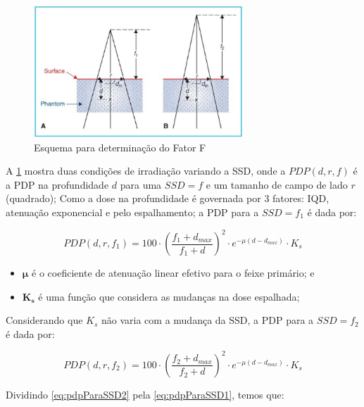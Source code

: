 \documentclass[11pt,a4paper]{article}
\newcounter{exemplo}
\begin{document}
	\begin{figure}[h]
		\centering
		\includegraphics[width=0.7\textwidth]{Imagens/fatorF.JPG}
		\caption{Esquema para determinação do Fator F}
		\label{fig:fatorF}
	\end{figure}
	
	A \ref{fig:fatorF} mostra duas condições de irradiação variando a SSD, onde a $PDP(d,r,f)$ é a PDP na profundidade $d$ para uma $SSD = f$ e um tamanho de campo de lado $r$ (quadrado); Como a dose na profundidade é governada por 3 fatores: IQD, atenuação exponencial e pelo espalhamento; a PDP  para a $SSD = f_1$ é dada por:
	
		\begin{equation}
			PDP(d, r, f_1) = 100 \cdot \left(\frac{f_1 + d_{max}}{f_1 + d}\right)^2 \cdot e^{-\mu (d - d_{max})} \cdot K_s
			\label{eq:pdpParaSSD1}
		\end{equation}
	
	\begin{exemplo}[onde:]
		\begin{itemize}
			\item \textcolor{CarnationPink}{$\mathbf{\mu}$} é o coeficiente de atenuação linear efetivo para o feixe primário; e
			\item \textcolor{CarnationPink}{$\mathbf{K_s}$} é uma função que considera as mudanças na dose espalhada;
		\end{itemize}
	\end{exemplo}

	Considerando que $K_s$ não varia com a mudança da SSD, a PDP para a $SSD = f_2$ é dada por:

	\begin{equation}
		PDP(d, r, f_2) = 100 \cdot \left(\frac{f_2 + d_{max}}{f_2 + d}\right)^2 \cdot e^{-\mu (d - d_{max})} \cdot K_s
		\label{eq:pdpParaSSD2}
	\end{equation}

	Dividindo \ref{eq:pdpParaSSD2} pela \ref{eq:pdpParaSSD1}, temos que:
\end{document}
